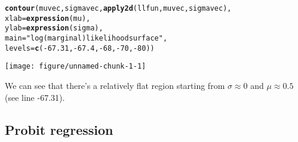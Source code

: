 \documentclass{article}\usepackage[]{graphicx}\usepackage[]{color}
\makeatletter
\def\maxwidth{ %
  \ifdim\Gin@nat@width>\linewidth
    \linewidth
  \else
    \Gin@nat@width
  \fi
}
\newcommand{\hlnum}[1]{\textcolor[rgb]{0.686,0.059,0.569}{#1}}%
\newcommand{\hlstr}[1]{\textcolor[rgb]{0.192,0.494,0.8}{#1}}%
\newcommand{\hlopt}[1]{\textcolor[rgb]{0,0,0}{#1}}%
\newcommand{\hlstd}[1]{\textcolor[rgb]{0.345,0.345,0.345}{#1}}%
\newcommand{\hlkwc}[1]{\textcolor[rgb]{0.333,0.667,0.333}{#1}}%
\newcommand{\hlkwd}[1]{\textcolor[rgb]{0.737,0.353,0.396}{\textbf{#1}}}%
\newenvironment{kframe}{%
 \def\at@end@of@kframe{}%
 \ifinner\ifhmode%
  \def\at@end@of@kframe{\end{minipage}}%
  \begin{minipage}{\columnwidth}%
 \fi\fi%
 \def\FrameCommand##1{\hskip\@totalleftmargin \hskip-\fboxsep
 \colorbox{shadecolor}{##1}\hskip-\fboxsep
     \hskip-\linewidth \hskip-\@totalleftmargin \hskip\columnwidth}%
 \MakeFramed {\advance\hsize-\width
   \@totalleftmargin\z@ \linewidth\hsize
   \@setminipage}}%
 {\par\unskip\endMakeFramed%
 \at@end@of@kframe}
\newenvironment{knitrout}{}{} %
\makeatother
\begin{document}
\begin{knitrout}
\begin{kframe}
\begin{alltt}
\hlkwd{contour}\hlstd{(muvec, sigmavec,} \hlkwd{apply2d}\hlstd{(llfun, muvec, sigmavec),}
                \hlkwc{xlab}\hlstd{=}\hlkwd{expression}\hlstd{(mu),}
                \hlkwc{ylab}\hlstd{=}\hlkwd{expression}\hlstd{(sigma),}
                \hlkwc{main}\hlstd{=}\hlstr{"log (marginal) likelihood surface"}\hlstd{,}
                \hlkwc{levels}\hlstd{=}\hlkwd{c}\hlstd{(}\hlopt{-}\hlnum{67.31}\hlstd{,} \hlopt{-}\hlnum{67.4}\hlstd{,} \hlopt{-}\hlnum{68}\hlstd{,} \hlopt{-}\hlnum{70}\hlstd{,} \hlopt{-}\hlnum{80}\hlstd{))}
\end{alltt}
\end{kframe}
\texttt{[image: figure/unnamed-chunk-1-1]} 

\end{knitrout}

We can see that there's a relatively flat region starting from $\sigma \approx 0$ and $\mu \approx 0.5$ (see line -67.31).

\subsection{Probit regression}
\end{document}
